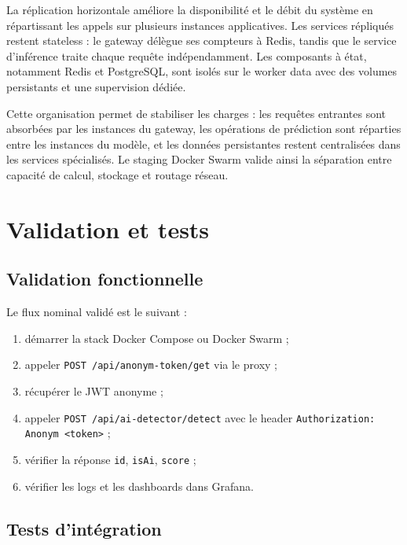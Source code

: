 ﻿\documentclass[12pt, a4paper]{report}
\begin{document}
La réplication horizontale améliore la disponibilité et le débit du système en
répartissant les appels sur plusieurs instances applicatives. Les services
répliqués restent stateless : le gateway délègue ses compteurs à Redis, tandis
que le service d'inférence traite chaque requête indépendamment. Les composants
à état, notamment Redis et PostgreSQL, sont isolés sur le worker data avec des
volumes persistants et une supervision dédiée.

Cette organisation permet de stabiliser les charges : les requêtes entrantes
sont absorbées par les instances du gateway, les opérations de prédiction sont
réparties entre les instances du modèle, et les données persistantes restent
centralisées dans les services spécialisés. Le staging Docker Swarm valide ainsi
la séparation entre capacité de calcul, stockage et routage réseau.


\chapter{Validation et tests}

\section{Validation fonctionnelle}

Le flux nominal validé est le suivant :

\begin{enumerate}
  \item démarrer la stack Docker Compose ou Docker Swarm ;
  \item appeler \texttt{POST /api/anonym-token/get} via le proxy ;
  \item récupérer le JWT anonyme ;
  \item appeler \texttt{POST /api/ai-detector/detect} avec le header
        \texttt{Authorization: Anonym <token>} ;
  \item vérifier la réponse \texttt{id}, \texttt{isAi}, \texttt{score} ;
  \item vérifier les logs et les dashboards dans Grafana.
\end{enumerate}

\section{Tests d'intégration}
\end{document}
